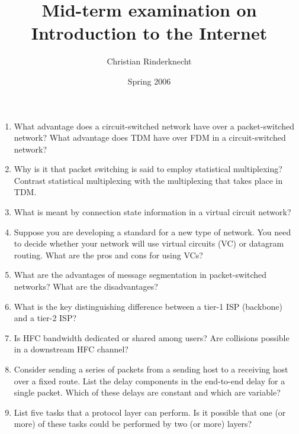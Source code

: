 \documentclass[11pt,a4paper]{article}
\title{Mid-term examination on\\ Introduction to the Internet}
\author{Christian Rinderknecht}
\date{Spring 2006}
\begin{document}
\maketitle
\thispagestyle{empty}

\begin{enumerate}

  \item What advantage does a circuit-switched network have over a
    packet-switched network? What advantage does TDM have over FDM in
    a circuit-switched network?

  \item Why is it that packet switching is said to employ statistical
    multiplexing? Contrast statistical multiplexing with the
    multiplexing that takes place in TDM.

  \item What is meant by connection state information in a virtual
    circuit network?

  \item Suppose you are developing a standard for a new type of
    network. You need to decide whether your network will use virtual
    circuits (VC) or datagram routing. What are the pros and cons for
    using VCs?

  \item What are the advantages of message segmentation in
    packet-switched networks? What are the disadvantages?

  \item What is the key distinguishing difference between a tier-1 ISP
    (backbone) and a tier-2 ISP?

  \item Is HFC bandwidth dedicated or shared among users? Are
    collisions possible in a downstream HFC channel?

  \item Consider sending a series of packets from a sending host to a
    receiving host over a fixed route. List the delay components in
    the end-to-end delay for a single packet. Which of these delays
    are constant and which are variable?

  \item List five tasks that a protocol layer can perform. Is it
    possible that one (or more) of these tasks could be performed by
    two (or more) layers?

\end{enumerate}
\end{document}
